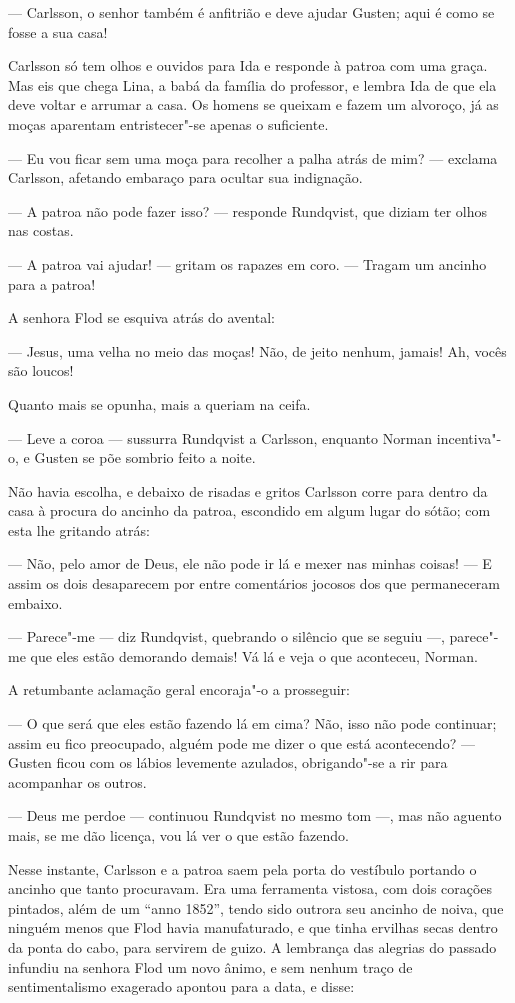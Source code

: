 --- Carlsson, o senhor também é anfitrião e deve ajudar Gusten; aqui é como se
fosse a sua casa!

Carlsson só tem olhos e ouvidos para Ida e responde à patroa com uma graça. Mas
eis que chega Lina, a babá da família do professor, e lembra Ida de que ela deve
voltar e arrumar a casa. Os homens se queixam e fazem um alvoroço, já as moças
aparentam entristecer"-se apenas o suficiente.

--- Eu vou ficar sem uma moça para recolher a palha atrás de mim? --- exclama
Carlsson, afetando embaraço para ocultar sua indignação.

--- A patroa não pode fazer isso? --- responde Rundqvist, que diziam ter olhos nas
costas.

--- A patroa vai ajudar! --- gritam os rapazes em coro. --- Tragam um ancinho para a
patroa!

A senhora Flod se esquiva atrás do avental:

--- Jesus, uma velha no meio das moças! Não, de jeito nenhum, jamais! Ah, vocês
são loucos!

Quanto mais se opunha, mais a queriam na ceifa.

--- Leve a coroa --- sussurra Rundqvist a Carlsson, enquanto Norman incentiva"-o, e
Gusten se põe sombrio feito a noite.

Não havia escolha, e debaixo de risadas e gritos Carlsson corre para dentro da
casa à procura do ancinho da patroa, escondido em algum lugar do sótão; com esta
lhe gritando atrás:

--- Não, pelo amor de Deus, ele não pode ir lá e mexer nas minhas coisas! --- E
assim os dois desaparecem por entre comentários jocosos dos que permaneceram
embaixo.

--- Parece"-me --- diz Rundqvist, quebrando o silêncio que se seguiu ---, parece"-me
que eles estão demorando demais! Vá lá e veja o que aconteceu, Norman.

A retumbante aclamação geral encoraja"-o a prosseguir:

--- O que será que eles estão fazendo lá em cima? Não, isso não pode
continuar; assim eu fico preocupado, alguém pode me dizer o que está acontecendo? --- Gusten ficou com
os lábios levemente azulados, obrigando"-se a rir para acompanhar os outros.

--- Deus me perdoe --- continuou Rundqvist no mesmo tom ---, mas não aguento mais,
se me dão licença, vou lá ver o que estão fazendo.

Nesse instante, Carlsson e a patroa saem pela porta do vestíbulo portando o
ancinho que tanto procuravam. Era uma ferramenta vistosa, com dois corações
pintados, além de um ``anno 1852'', tendo sido outrora seu ancinho de noiva, que
ninguém menos que Flod havia manufaturado, e que tinha ervilhas secas dentro da
ponta do cabo, para servirem de guizo. A lembrança das alegrias do passado
infundiu na senhora Flod um novo ânimo, e sem nenhum traço de sentimentalismo
exagerado apontou para a data, e disse:

